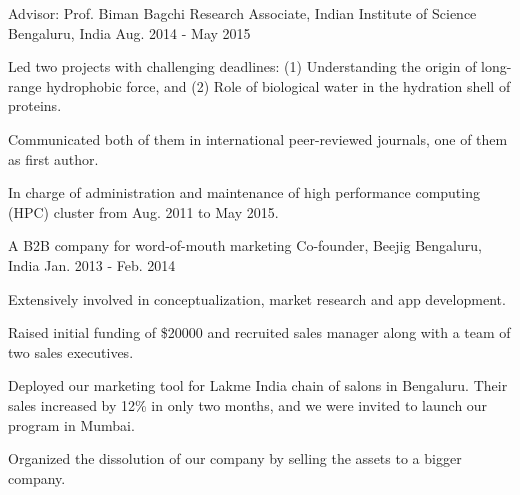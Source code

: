 \begin{cventries}
\cventry
{Advisor: Prof. Biman Bagchi} %
{Research Associate, Indian Institute of Science} %
{Bengaluru, India} %
{Aug. 2014 - May 2015} %
{ %
\begin{cvitems}
\item {Led two projects with challenging deadlines: (1) Understanding the origin of long-range hydrophobic force, and (2) Role of biological water in the hydration shell of proteins.}
\item {Communicated both of them in international peer-reviewed journals, one of them as first author.}
\item {In charge of administration and maintenance of high performance computing (HPC) cluster from Aug. 2011 to May 2015.}
\end{cvitems}
}


\cventry
{A B2B company for word-of-mouth marketing} %
{Co-founder, Beejig} %
{Bengaluru, India} %
{Jan. 2013 - Feb. 2014} %
{ %
\begin{cvitems}
\item {Extensively involved in conceptualization, market research and app development.}
\item {Raised initial funding of \$20000 and recruited sales manager along with a team of two sales executives.}
\item {Deployed our marketing tool for Lakme India chain of salons in Bengaluru. Their sales increased by 12\% in only two months, and we were invited to launch our program in Mumbai.}
\item {Organized the dissolution of our company by selling the assets to a bigger company.}
\end{cvitems}
}


\end{cventries}
